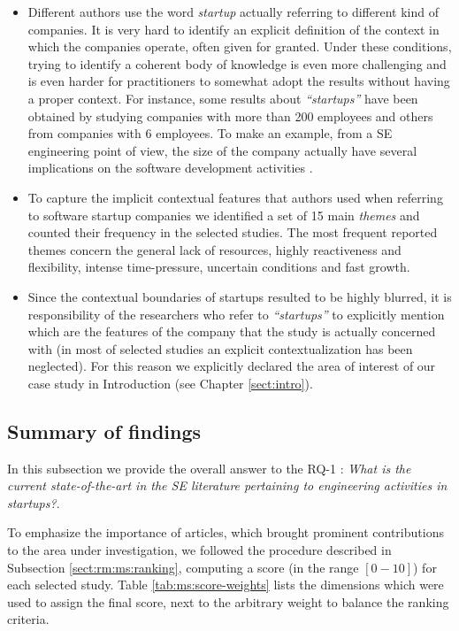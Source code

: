 \documentclass[final,5p,times,twocolumn]{elsarticle}
\begin{document}
\begin{itemize}

\item Different authors use the word \textit{startup} actually referring to different kind of companies. It is very hard to identify an explicit definition of the context in which the companies operate, often given for granted. Under these conditions, trying to identify a coherent body of knowledge is even more challenging and is even harder for practitioners to somewhat adopt the results without having a proper context. For instance, some results about \textit{``startups''} have been obtained by studying companies with  more than 200 employees and others from companies with 6 employees. To make an example, from a SE engineering point of view, the size of the company actually have several implications on the software development activities \cite{Wangenheim2006}.

\item To capture the implicit contextual features that authors used when referring to software startup companies we identified a set of 15 main \textit{themes} and counted their frequency in the selected studies. The most frequent reported themes concern the general lack of resources, highly reactiveness and flexibility, intense time-pressure, uncertain conditions and fast growth.
\item Since the contextual boundaries of startups resulted to be highly blurred, it is responsibility of the researchers who refer to \textit{``startups''} to explicitly mention which are the features of the company that the study is actually concerned with (in most of selected studies an explicit contextualization has been neglected). For this reason we explicitly declared the area of interest of our case study in Introduction (see Chapter \ref{sect:intro}).
\end{itemize}



\subsection{Summary of findings} %
\label{sub:summary_of_findings}


In this subsection we provide the overall answer to the RQ-1 : \textit{What is the current state-of-the-art in the SE literature pertaining to engineering activities in startups?}.

To emphasize the importance of articles, which brought prominent contributions to the area under investigation, we followed the procedure described in Subsection \ref{sect:rm:ms:ranking}, computing  a score (in the range $[0-10]$) for each selected study.  Table \ref{tab:ms:score-weights} lists the dimensions which were used to assign the final score,  next to the arbitrary weight to balance the ranking criteria.
\end{document}
